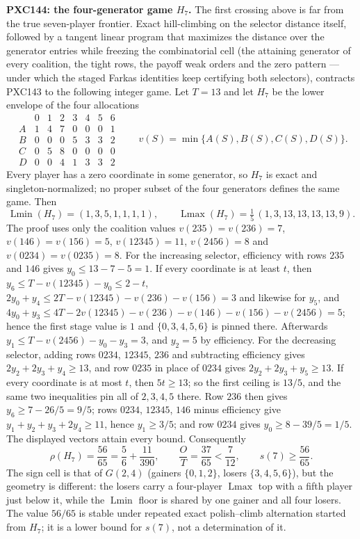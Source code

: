 \documentclass[11pt]{article}
\newcommand{\Lmin}{\operatorname{Lmin}}
\newcommand{\Lmax}{\operatorname{Lmax}}
\begin{document}
\medskip
\noindent\textbf{PXC144: the four-generator game \(H_7\).}
The first crossing above is far from the true seven-player frontier.
Exact hill-climbing on the selector distance itself, followed by a tangent
linear program that maximizes the distance over the generator entries while
freezing the combinatorial cell (the attaining generator of every coalition,
the tight rows, the payoff weak orders and the zero pattern --- under which
the staged Farkas identities keep certifying both selectors), contracts
PXC143 to the following integer game.  Let \(T=13\) and let \(H_7\) be the
lower envelope of the four allocations
\[
\begin{array}{c|rrrrrrr}
 &0&1&2&3&4&5&6\\ \hline
A&1&4&7&0&0&0&1\\
B&0&0&0&5&3&3&2\\
C&0&5&8&0&0&0&0\\
D&0&0&4&1&3&3&2
\end{array}
\qquad
v(S)=\min\{A(S),B(S),C(S),D(S)\}.                       \tag{PXC144a}
\]
Every player has a zero coordinate in some generator, so \(H_7\) is exact
and singleton-normalized; no proper subset of the four generators defines
the same game.  Then
\begin{equation}
 \Lmin(H_7)=(1,3,5,1,1,1,1),\qquad
 \Lmax(H_7)=\tfrac15\,(1,3,13,13,13,13,9).                \tag{PXC144b}
\end{equation}
The proof uses only the coalition values
\(v(235)=v(236)=7\), \(v(146)=v(156)=5\), \(v(12345)=11\), \(v(2456)=8\)
and \(v(0234)=v(0235)=8\).  For the increasing selector, efficiency with
rows \(235\) and \(146\) gives \(y_0\le13-7-5=1\).  If every coordinate is
at least \(t\), then \(y_6\le T-v(12345)-y_0\le2-t\),
\(2y_0+y_4\le2T-v(12345)-v(236)-v(156)=3\) and likewise for \(y_5\), and
\(4y_0+y_3\le4T-2v(12345)-v(236)-v(146)-v(156)-v(2456)=5\); hence the first
stage value is \(1\) and \(\{0,3,4,5,6\}\) is pinned there.  Afterwards
\(y_1\le T-v(2456)-y_0-y_3=3\), and \(y_2=5\) by efficiency.  For the
decreasing selector, adding rows \(0234\), \(12345\), \(236\) and
subtracting efficiency gives \(2y_2+2y_3+y_4\ge13\), and row \(0235\) in
place of \(0234\) gives \(2y_2+2y_3+y_5\ge13\).  If every coordinate is at
most \(t\), then \(5t\ge13\); so the first ceiling is \(13/5\), and the same
two inequalities pin all of \(2,3,4,5\) there.  Row \(236\) then gives
\(y_6\ge7-26/5=9/5\); rows \(0234\), \(12345\), \(146\) minus efficiency
give \(y_1+y_2+y_3+2y_4\ge11\), hence \(y_1\ge3/5\); and row \(0234\) gives
\(y_0\ge8-39/5=1/5\).  The displayed vectors attain every bound.
Consequently
\begin{equation}
 \rho(H_7)=\frac{56}{65}=\frac56+\frac{11}{390},\qquad
 \frac{O}{T}=\frac{37}{65}<\frac7{12},\qquad s(7)\ge\frac{56}{65}. \tag{PXC144c}
\end{equation}
The sign cell is that of \(G(2,4)\) (gainers \(\{0,1,2\}\), losers
\(\{3,4,5,6\}\)), but the geometry is different: the losers carry a
four-player \(\Lmax\) top with a fifth player just below it, while the
\(\Lmin\) floor is shared by one gainer and all four losers.  The value
\(56/65\) is stable under repeated exact polish--climb alternation started
from \(H_7\); it is a lower bound for \(s(7)\), not a determination of it.
\end{document}
